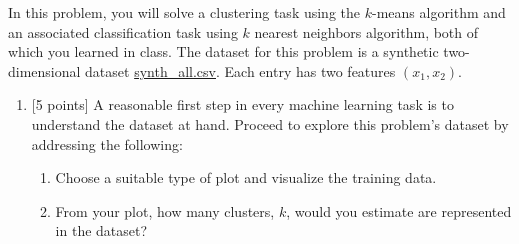 \documentclass[12pt]{article}
\newenvironment{problem}[2][Problem:]{\begin{trivlist}
\item[\hskip \labelsep {\bfseries #1}\hskip \labelsep {\bfseries #2.}]}{\end{trivlist}}
\begin{document}
\begin{problem}{$K$-Means Clustering [15 points]}
In this problem, you will solve a clustering task using the $k$-means algorithm and an associated classification task using $k$ nearest neighbors algorithm, both of which you learned in class. 
The dataset for this problem is a synthetic two-dimensional dataset \href{https://canvas.dartmouth.edu/files/3128646/download?download_frd=1}{{synth\_all.csv}}.
Each entry has two features $(x_1,x_2)$. 

\begin{enumerate}
    \item {[5 points]} A reasonable first step in every machine learning task is to understand the dataset at hand. Proceed to explore this problem's dataset by addressing the following:
    \begin{enumerate}
            \item Choose a suitable type of plot and visualize the training data.
            \item From your plot, how many clusters, $k$, would you estimate are represented in the dataset? \label{pt:clusters}
    \end{enumerate}


\end{enumerate}
\end{problem}
\end{document}

